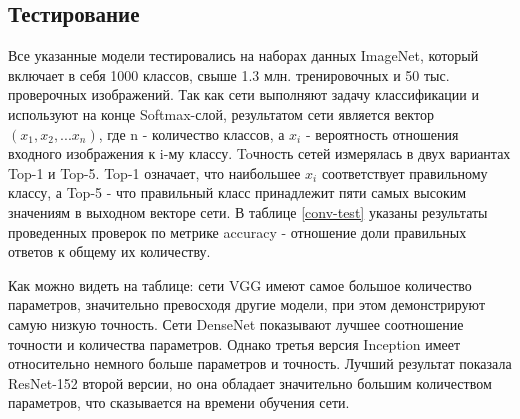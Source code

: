 


\subsection{Тестирование}
Все указанные модели тестировались на наборах данных ImageNet, который включает в себя 1000 классов, свыше 1.3 млн. тренировочных и 50 тыс. проверочных изображений. Так как сети выполняют задачу классификации и используют на конце Softmax-слой, результатом сети является вектор $(x_1,x_2,...x_n)$, где n - количество классов, а $x_i$ - вероятность отношения входного изображения к i-му классу. Toчность сетей измерялась в двух вариантах Top-1 и Top-5. Top-1 означает, что наибольшее $x_i$ соответствует правильному классу, а Top-5 - что правильный класс принадлежит пяти самых высоким значениям в выходном векторе сети. В таблице \ref{conv-test} указаны результаты проведенных проверок по метрике accuracy - отношение доли правильных ответов к общему их количеству. 



Как можно видеть на таблице: сети VGG имеют самое большое количество параметров, значительно превосходя другие модели, при этом демонстрируют самую низкую точность. Сети DenseNet показывают лучшее соотношение точности и количества параметров. Однако третья версия Inception имеет относительно немного больше параметров и точность. Лучший результат показала ResNet-152 второй версии, но она обладает значительно большим количеством параметров, что сказывается на времени обучения сети.

\clearpage